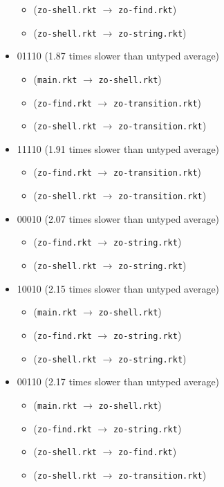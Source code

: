 \documentclass{article}
\newcommand{\mono}[1]{\texttt{#1}}
\begin{document}
\begin{itemize}
\begin{itemize}
  \item (\mono{zo-shell.rkt} $\rightarrow$ \mono{zo-find.rkt})
  \item (\mono{zo-shell.rkt} $\rightarrow$ \mono{zo-string.rkt})
  \end{itemize}
\item 01110 (1.87 times slower than untyped average)
  \begin{itemize}
  \item (\mono{main.rkt} $\rightarrow$ \mono{zo-shell.rkt})
  \item (\mono{zo-find.rkt} $\rightarrow$ \mono{zo-transition.rkt})
  \item (\mono{zo-shell.rkt} $\rightarrow$ \mono{zo-transition.rkt})
  \end{itemize}
\item 11110 (1.91 times slower than untyped average)
  \begin{itemize}
  \item (\mono{zo-find.rkt} $\rightarrow$ \mono{zo-transition.rkt})
  \item (\mono{zo-shell.rkt} $\rightarrow$ \mono{zo-transition.rkt})
  \end{itemize}
\item 00010 (2.07 times slower than untyped average)
  \begin{itemize}
  \item (\mono{zo-find.rkt} $\rightarrow$ \mono{zo-string.rkt})
  \item (\mono{zo-shell.rkt} $\rightarrow$ \mono{zo-string.rkt})
  \end{itemize}
\item 10010 (2.15 times slower than untyped average)
  \begin{itemize}
  \item (\mono{main.rkt} $\rightarrow$ \mono{zo-shell.rkt})
  \item (\mono{zo-find.rkt} $\rightarrow$ \mono{zo-string.rkt})
  \item (\mono{zo-shell.rkt} $\rightarrow$ \mono{zo-string.rkt})
  \end{itemize}
\item 00110 (2.17 times slower than untyped average)
  \begin{itemize}
  \item (\mono{main.rkt} $\rightarrow$ \mono{zo-shell.rkt})
  \item (\mono{zo-find.rkt} $\rightarrow$ \mono{zo-string.rkt})
  \item (\mono{zo-shell.rkt} $\rightarrow$ \mono{zo-find.rkt})
  \item (\mono{zo-shell.rkt} $\rightarrow$ \mono{zo-transition.rkt})
  \end{itemize}


\end{itemize}
\end{document}
